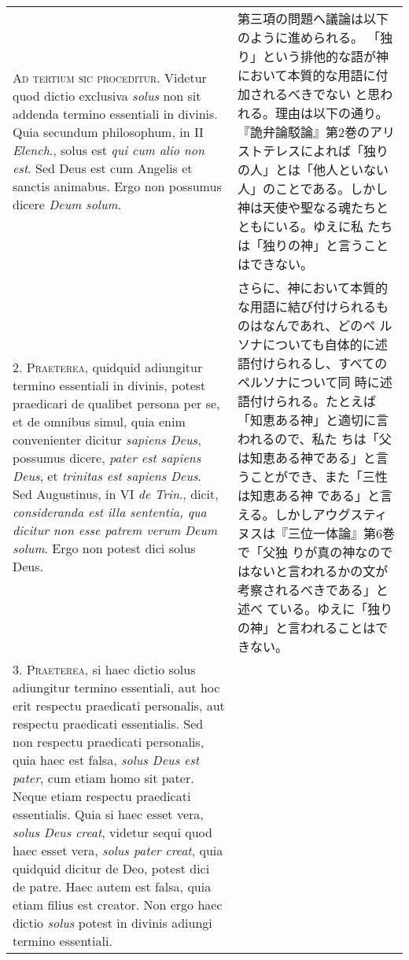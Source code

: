 \documentclass[10pt]{jsarticle} %
\begin{document}
\begin{longtable}{p{21em}p{21em}}

{\scshape Ad tertium sic proceditur}. Videtur quod dictio exclusiva {\itshape solus} non sit
 addenda termino essentiali in divinis. Quia secundum philosophum, in
 II {\itshape Elench}., solus est {\itshape qui cum alio non est}. Sed Deus est cum Angelis
 et sanctis animabus. Ergo non possumus dicere {\itshape Deum solum}.

&

第三項の問題へ議論は以下のように進められる。
「独り」という排他的な語が神において本質的な用語に付加されるべきでない
 と思われる。理由は以下の通り。
『詭弁論駁論』第2巻のアリストテレスによれば「独りの人」とは「他人といない
 人」のことである。しかし神は天使や聖なる魂たちとともにいる。ゆえに私
 たちは「独りの神」と言うことはできない。


\\




2. {\scshape Praeterea}, quidquid adiungitur termino essentiali in divinis, potest
 praedicari de qualibet persona per se, et de omnibus simul, quia enim
 convenienter dicitur {\itshape sapiens Deus}, possumus dicere, {\itshape pater est sapiens
 Deus}, et {\itshape trinitas est sapiens Deus}. Sed Augustinus, in VI {\itshape de Trin}.,
 dicit, {\itshape consideranda est illa sententia, qua dicitur non esse patrem
 verum Deum solum}. Ergo non potest dici solus Deus.

&

さらに、神において本質的な用語に結び付けられるものはなんであれ、どのペ
 ルソナについても自体的に述語付けられるし、すべてのペルソナについて同
 時に述語付けられる。たとえば「知恵ある神」と適切に言われるので、私た
 ちは「父は知恵ある神である」と言うことができ、また「三性は知恵ある神
 である」と言える。しかしアウグスティヌスは『三位一体論』第6巻で「父独
 りが真の神なのではないと言われるかの文が考察されるべきである」と述べ
 ている。ゆえに「独りの神」と言われることはできない。


\\




3. {\scshape Praeterea}, si haec dictio solus adiungitur termino essentiali, aut hoc
 erit respectu praedicati personalis, aut respectu praedicati
 essentialis. Sed non respectu praedicati personalis, quia haec est
 falsa, {\itshape solus Deus est pater}, cum etiam homo sit pater. Neque etiam
 respectu praedicati essentialis. Quia si haec esset vera, {\itshape solus Deus
 creat}, videtur sequi quod haec esset vera, {\itshape solus pater creat}, quia
 quidquid dicitur de Deo, potest dici de patre. Haec autem est falsa,
 quia etiam filius est creator. Non ergo haec dictio {\itshape solus} potest in
 divinis adiungi termino essentiali.


\end{longtable}
\end{document}
